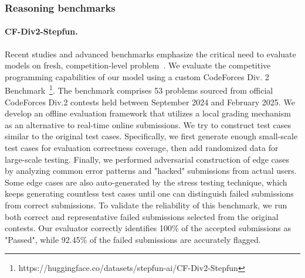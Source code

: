 \subsubsection{Reasoning benchmarks}

\paragraph{CF-Div2-Stepfun.} Recent studies and advanced benchmarks emphasize the critical need to evaluate models on fresh, competition-level problem~\cite{zheng2025livecodebench,anonymous2026autocode}. We evaluate the competitive programming capabilities of our model using a custom CodeForces Div. 2 Benchmark~\footnote{https://huggingface.co/datasets/stepfun-ai/CF-Div2-Stepfun}. The benchmark comprises 53 problems sourced from official CodeForces Div.2 contests held between September 2024 and February 2025. We develop an offline evaluation framework that utilizes a local grading mechanism as an alternative to real-time online submissions. We try to construct test cases similar to the original test cases. Specifically, we first generate enough small-scale test cases for evaluation correctness coverage, then add randomized data for large-scale testing. Finally, we performed adversarial construction of edge cases by analyzing common error patterns and "hacked" submissions from actual users. Some edge cases are also auto-generated by the stress testing technique, which keeps generating countless test cases until one can distinguish failed submissions from correct submissions. To validate the reliability of this benchmark, we run both correct and representative failed submissions selected from the original contests. Our evaluator correctly identifies 100\% of the accepted submissions as "Passed", while 92.45\% of the failed submissions are accurately flagged.
~\label{cf-div2-step}

